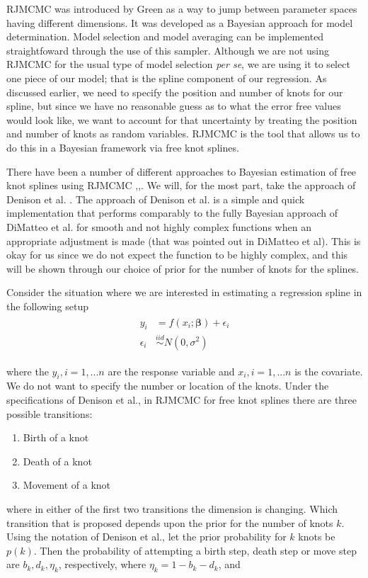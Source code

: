 \documentclass[11pt]{article}\usepackage[]{graphicx}\usepackage[]{color}
\begin{document}
RJMCMC was introduced by Green \cite{green} as a way to jump between parameter spaces having different dimensions. It was developed as a Bayesian approach  for model determination. Model selection and model averaging can be implemented straightfoward through the use of this sampler. Although we are not using RJMCMC for the usual type of model selection \emph{per se}, we are using it to select one piece of our model; that is the spline component of our regression. As discussed earlier, we need to specify the position and number of knots for our spline, but since we have no reasonable guess as to what the error free values would look like, we want to account for that uncertainty by treating the position and number of knots as random variables. RJMCMC is the tool that allows us to do this in a Bayesian framework via free knot splines. 

There have been a number of different approaches to Bayesian estimation of free knot splines using RJMCMC \cite{dimatteo},\cite{lindstrom},\cite{johnson}. We will, for the most part, take the approach of Denison et al. \cite{denison}. The approach of Denison et al. is a simple and quick implementation that performs comparably  to the fully Bayesian approach of DiMatteo et al. \cite{dimatteo} for smooth and not highly complex functions when an appropriate adjustment is made (that was pointed out in DiMatteo et al). This is okay for us since we do not expect the function to be highly complex, and this will be shown through our choice of prior for the number of knots for the splines.

Consider the situation where we are interested in estimating a regression spline in the following setup
\begin{align}
\begin{split}
\label{simplespline}
y_i &= f(x_i;\boldsymbol{\beta}) + \epsilon_i \\
\epsilon_i &\overset{iid}{\sim} N(0,\sigma^2)
\end{split}
\end{align}

where the $y_i,i=1,...n$ are the response variable and $x_i,i=1,...n$ is the covariate. We do not want to specify the number or location of the knots. Under the specifications of Denison et al., in RJMCMC for free knot splines there are three possible transitions: 
\begin{enumerate}
\item
Birth of a knot 
\item
Death of a knot
\item
Movement of a knot
\end{enumerate}
where in either of the first two transitions the dimension is changing. Which transition that is proposed depends upon the prior for the number of knots $k$. Using the notation of Denison et al., let the prior probability for $k$ knots be $p(k)$. Then the probability of attempting a birth step, death step or move step are $b_k,d_k,\eta_k$, respectively, where $\eta_k=1-b_k-d_k$, and
\end{document}
